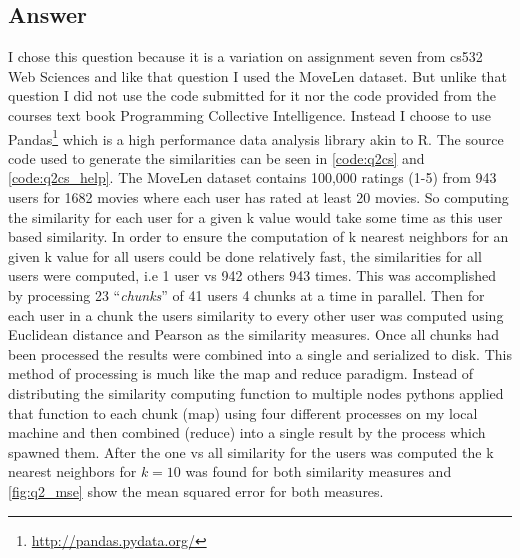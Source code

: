 \documentclass[11pt]{article}
\begin{document}
\subsection*{Answer} 
I chose this question because it is a variation on assignment seven from cs532 Web Sciences and like that question I used the MoveLen dataset. 
But unlike that question I did not use the code submitted for it nor the code provided from the courses text book Programming Collective Intelligence. Instead I choose to use Pandas\footnote{\href{http://pandas.pydata.org/}{http://pandas.pydata.org/}} which is a high performance data analysis library akin to R. The source code used to generate the similarities can be seen in \autoref{code:q2cs} and \autoref{code:q2cs_help}.\newline 
\indent The MoveLen dataset contains 100,000 ratings (1-5) from 943 users for 1682 movies where each user has rated at least 20 movies. So computing the similarity for each user for a given k value would take some time as this user based similarity. In order to ensure the computation of k nearest neighbors  for an given k value for all users could be done relatively fast, the similarities for all users were computed, i.e 1 user vs 942 others 943 times. This was accomplished by processing 23 \enquote{\textit{chunks}} of 41 users 4 chunks at a time in parallel. Then for each user in a chunk the users similarity to every other user was computed using Euclidean distance and Pearson as the similarity measures. Once all chunks had been processed the results were combined into a single  and serialized to disk. This method of processing is much like the map and reduce paradigm. Instead of distributing the similarity computing function to multiple nodes pythons  applied that function to each chunk (map) using four different processes on my local machine and then combined (reduce) into a single result by the process which spawned them. \newline
\indent After the one vs all similarity for the users was computed the k nearest neighbors for $k=10$ was found for both similarity measures and \autoref{fig:q2_mse} show the mean squared error for both measures.
\end{document}
